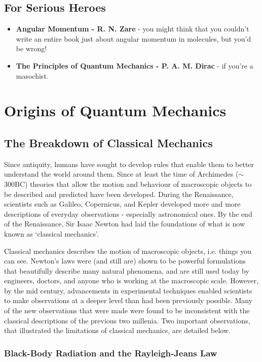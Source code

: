 \documentclass{memoir}[11pt,oneside,a4paper,openany]
\begin{document}
\section*{For Serious Heroes}
\begin{itemize}
	\item \textbf{Angular Momentum - R. N. Zare} - you might think that you couldn't write an entire book just about angular momentum in molecules, but you'd be wrong! 
	\item \textbf{The Principles of Quantum Mechanics - P. A. M. Dirac} - if you're a masochist.
\end{itemize}

\chapter{Origins of Quantum Mechanics}

\section{The Breakdown of Classical Mechanics}
Since antiquity, humans have sought to develop rules that enable them to better understand the world around them. Since at least the time of Archimedes ($\sim$300BC) theories that allow the motion and behaviour of macroscopic objects to be described and predicted have been developed. During the Renaissance, scientists such as Galileo, Copernicus, and Kepler developed more and more descriptions of everyday observations - especially astronomical ones. By the end of the Renaissance, Sir Isaac Newton had laid the foundations of what is now known as `classical mechanics'. 

Classical mechanics describes the motion of macroscopic objects, i.e. things you can see. Newton's laws were (and still are) shown to be powerful formulations that beautifully describe many natural phenomena, and are still used today by engineers, doctors, and anyone who is working at the macroscopic scale. However, by the mid  century, advancements in experimental techniques enabled scientists to make observations at a deeper level than had been previously possible. Many of the new observations that were made were found to be inconsistent with the classical descriptions of the previous two millenia. Two important observations, that illustrated the limitations of classical mechanics, are detailed below.

\subsection{Black-Body Radiation and the Rayleigh-Jeans Law}
\end{document}

